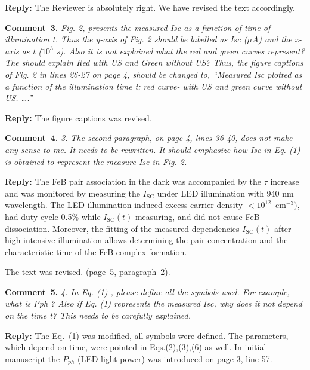 \documentclass[sn-mathphys]{sn-jnl}
\begin{document}
\noindent
\textcolor[rgb]{0.51,0.00,0.00}{\textbf{Reply:}}
The Reviewer is absolutely right. We have revised the text accordingly.

\vspace{1cm}
\noindent
\textcolor[rgb]{0.00,0.50,1.00}{\textbf{Comment~3.}}
\emph{Fig. 2, presents the measured Isc as a function of time of illumination t.
Thus the y-axis of Fig. 2 should be labelled as Isc ($\mu$A) and the x-axis as t ($10^3$ s).
Also it is not explained what the red and green curves represent?
The should explain Red with US and Green without US?
Thus, the figure captions of Fig. 2 in lines 26-27 on page 4, should be changed to, “Measured Isc plotted as a function of the illumination time t; red curve- with US and green curve without US. ….”}

\noindent
\textcolor[rgb]{0.51,0.00,0.00}{\textbf{Reply:}}
The figure captions was revised.


\vspace{1cm}
\noindent
\textcolor[rgb]{0.00,0.50,1.00}{\textbf{Comment~4.}}
\emph{3.	The second paragraph, on page 4, lines 36-40, does not make any sense to me.
It needs to be rewritten.
It should emphasize how Isc in Eq. (1) is obtained to represent the measure Isc in Fig. 2.}

\noindent
\textcolor[rgb]{0.51,0.00,0.00}{\textbf{Reply:}}
The FeB pair association in the dark was accompanied by the $\tau$ increase and
was monitored by measuring the $I_\mathrm{SC}$ under LED illumination with 940 nm wavelength.
The LED illumination induced excess carrier density $<10^{12}$~cm$^{-3})$,
had duty cycle 0.5\% while $I_\mathrm{SC}(t)$ measuring,
and did not cause FeB dissociation.
Moreover, the fitting of the measured dependencies $I_\mathrm{SC}(t)$ after high-intensive illumination
allows determining  the pair concentration and the characteristic time of the FeB complex formation.


The text was revised.
(page~5, paragraph~2).

\vspace{1cm}
\noindent
\textcolor[rgb]{0.00,0.50,1.00}{\textbf{Comment~5.}}
\emph{4.	In Eq. (1) , please define all the symbols used. For example, what is Pph ?
Also if Eq. (1) represents the measured Isc, why does it not depend on the time t?
This needs to be carefully explained.}

\noindent
\textcolor[rgb]{0.51,0.00,0.00}{\textbf{Reply:}}
The Eq.~(1) was modified,
all symbols were defined.
The parameters, which depend on time, were pointed in Eqs.(2),(3),(6) as well.
In initial manuscript the $P_{ph}$ (LED light power) was introduced on page 3, line 57.
\end{document}

